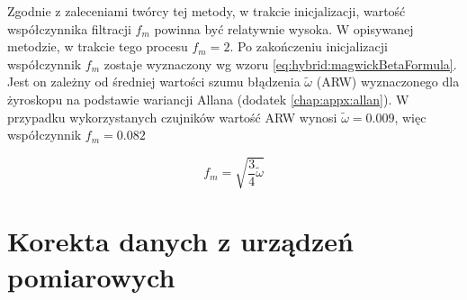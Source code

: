 Zgodnie z zaleceniami twórcy tej metody, w trakcie inicjalizacji, wartość współczynnika filtracji $f_m$ powinna być relatywnie wysoka. W opisywanej metodzie, w trakcie tego procesu $f_m = 2$. Po zakończeniu inicjalizacji współczynnik $f_m$ zostaje wyznaczony wg wzoru \eqref{eq:hybrid:magwickBetaFormula}. Jest on zależny od średniej wartości szumu błądzenia $\widetilde{\omega}$ (ARW) wyznaczonego dla żyroskopu na podstawie wariancji Allana (dodatek \ref{chap:appx:allan}). W przypadku wykorzystanych czujników wartość ARW wynosi $\widetilde{\omega} = 0.009$, więc współczynnik $f_m = 0.082$

\begin{equation}
	f_m = \sqrt{\frac{3}{4}\widetilde{\omega}}
	\label{eq:hybrid:magwickBetaFormula}
\end{equation}

\section{Korekta danych z urządzeń pomiarowych}

